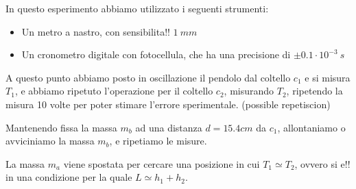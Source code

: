 In questo esperimento abbiamo utilizzato i seguenti strumenti:
\begin{itemize}
  \item Un metro a nastro, con sensibilita!! $1\ mm$
  \item Un cronometro digitale con fotocellula, che ha una precisione di $\pm 0.1 \cdot 10^{-3}\ s$
\end{itemize}

A questo punto abbiamo posto in oscillazione il pendolo dal coltello $c_1$ e si misura $T_1$, e abbiamo ripetuto l'operazione per il coltello $c_2$, misurando $T_2$, ripetendo la misura 10 volte per poter stimare l'errore sperimentale. (possible repetiscion)

Mantenendo fissa la massa $m_b$ ad una distanza $d = 15.4cm$ da $c_1$, allontaniamo o avviciniamo la massa $m_b$, e ripetiamo le misure.

La massa $m_a$ viene spostata per cercare una posizione in cui $T_1 \simeq T_2$, ovvero si e!! in una condizione per la quale $L\simeq h_1+h_2$. 

